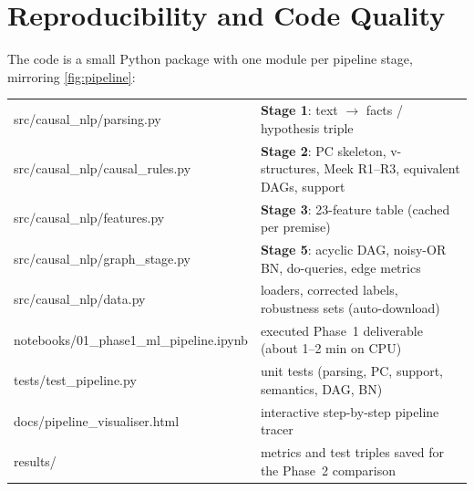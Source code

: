 \documentclass[11pt,a4paper]{article}
\begin{document}
\section{Reproducibility and Code Quality}\label{sec:repro}

The code is a small Python package with one module per pipeline stage, mirroring \cref{fig:pipeline}:

\begin{examplebox}
\footnotesize
\begin{tabularx}{\linewidth}{@{}>{\ttfamily}l@{\hspace{1.2em}}>{\leavevmode\color{slate}\raggedright\arraybackslash}X@{}}
src/causal\_nlp/parsing.py      & \textcolor{neural}{\textbf{Stage 1}}: text $\rightarrow$ facts / hypothesis triple \\
src/causal\_nlp/causal\_rules.py & \textcolor{symbolic}{\textbf{Stage 2}}: PC skeleton, v-structures, Meek R1--R3, equivalent DAGs, support \\
src/causal\_nlp/features.py     & \textcolor{symbolic}{\textbf{Stage 3}}: 23-feature table (cached per premise) \\
src/causal\_nlp/graph\_stage.py  & \textcolor{causal}{\textbf{Stage 5}}: acyclic DAG, noisy-OR BN, do-queries, edge metrics \\
src/causal\_nlp/data.py         & loaders, corrected labels, robustness sets (auto-download) \\
notebooks/01\_phase1\_ml\_pipeline.ipynb & executed Phase~1 deliverable (about 1--2 min on CPU) \\
tests/test\_pipeline.py         & 14 unit tests (parsing, PC, support, semantics, DAG, BN) \\
docs/pipeline\_visualiser.html  & interactive step-by-step pipeline tracer \\
results/                        & metrics and test triples saved for the Phase~2 comparison \\
\end{tabularx}
\end{examplebox}
\end{document}
